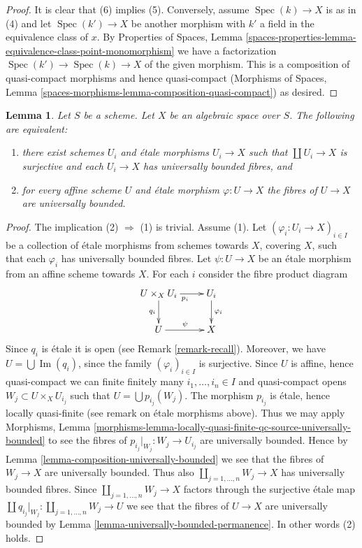 \documentclass{stacks-project}
\theoremstyle{plain}
\newtheorem{lemma}[subsection]{Lemma}
\theoremstyle{definition}
\theoremstyle{remark}
\numberwithin{equation}{subsection}
\def\Spec{\mathop{\mathrm{Spec}}}
\def\Im{\mathop{\mathrm{Im}}}
\begin{document}
\begin{proof}
\medskip\noindent
It is clear that (6) implies (5). Conversely, assume $\Spec(k) \to X$ is
as in (4) and let $\Spec(k') \to X$ be another morphism with $k'$ a
field in the equivalence class of $x$. By
Properties of Spaces, Lemma
\ref{spaces-properties-lemma-equivalence-class-point-monomorphism}
we have a factorization $\Spec(k') \to \Spec(k) \to X$ of the
given morphism. This is a composition of quasi-compact
morphisms and hence quasi-compact (Morphisms of Spaces,
Lemma \ref{spaces-morphisms-lemma-composition-quasi-compact}) as desired.
\end{proof}

\begin{lemma}
\label{lemma-U-universally-bounded}
Let $S$ be a scheme. Let $X$ be an algebraic space over $S$.
The following are equivalent:
\begin{enumerate}
\item there exist schemes $U_i$ and \'etale morphisms
$U_i \to X$ such that $\coprod U_i \to X$ is surjective and
each $U_i \to X$ has universally bounded fibres, and
\item for every affine scheme $U$ and \'etale morphism $\varphi : U \to X$
the fibres of $U \to X$ are universally bounded.
\end{enumerate}
\end{lemma}

\begin{proof}
The implication (2) $\Rightarrow$ (1) is trivial.
Assume (1). Let $(\varphi_i : U_i \to X)_{i \in I}$ be a collection of
\'etale morphisms from schemes towards $X$, covering $X$, such that
each $\varphi_i$ has universally bounded fibres.
Let $\psi : U \to X$ be an \'etale morphism from an affine scheme towards $X$.
For each $i$ consider the fibre product diagram
$$
\xymatrix{
U \times_X U_i \ar[r]_{p_i} \ar[d]_{q_i} & U_i \ar[d]^{\varphi_i} \\
U \ar[r]^\psi & X
}
$$
Since $q_i$ is \'etale it is open (see Remark \ref{remark-recall}).
Moreover, we have $U = \bigcup \Im(q_i)$, since the family
$(\varphi_i)_{i \in I}$ is surjective. Since $U$ is affine, hence quasi-compact
we can finite finitely many $i_1, \ldots, i_n \in I$ and quasi-compact
opens $W_j \subset U \times_X U_{i_j}$ such that
$U = \bigcup p_{i_j}(W_j)$.
The morphism $p_{i_j}$ is \'etale, hence locally quasi-finite
(see remark on \'etale morphisms above). Thus we may apply
Morphisms, Lemma
\ref{morphisms-lemma-locally-quasi-finite-qc-source-universally-bounded}
to see the fibres of $p_{i_j}|_{W_j} : W_j \to U_{i_j}$ are universally
bounded. Hence by
Lemma \ref{lemma-composition-universally-bounded}
we see that the fibres of $W_j \to X$ are universally bounded.
Thus also $\coprod_{j = 1, \ldots, n} W_j \to X$ has universally
bounded fibres. Since $\coprod_{j = 1, \ldots, n} W_j \to X$ factors
through the surjective \'etale map
$\coprod q_{i_j}|_{W_j} : \coprod_{j = 1, \ldots, n} W_j \to U$ we
see that the fibres of $U \to X$ are universally bounded by
Lemma \ref{lemma-universally-bounded-permanence}.
In other words (2) holds.
\end{proof}
\end{document}
